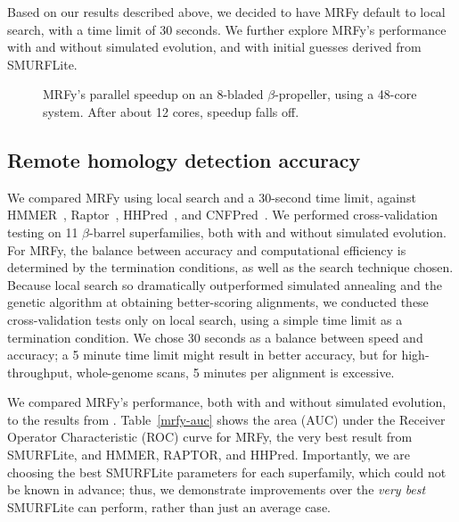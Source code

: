 \documentclass[blockstyle,times,preprint]{sigplanconf}
\begin{document}
Based on our results described above, we decided to have MRFy default to local 
search, with a time limit of 30 seconds.
We further explore MRFy's performance with and without simulated evolution,
and with initial guesses derived from SMURFLite.

\begin{figure}[htb!]
\begin{center}
   \caption{MRFy's parallel speedup on an 8-bladed $\beta$-propeller, using a
   48-core system.
   After about 12 cores, speedup falls off.}
   \label{speedup}
 \end{center}
\end{figure}

\subsection{Remote homology detection accuracy}

We compared MRFy using local search and a 30-second time limit, against 
HMMER~\cite{Eddy:1998ut},
Raptor~\cite{Xu:2003p3417}, HHPred~\cite{Soding:2005ff}, 
and CNFPred~\cite{JianzhuMa:2012cp}.
We performed cross-validation testing on 11 $\beta$-barrel superfamilies, both
with and without simulated evolution.
For MRFy, the balance between accuracy and computational efficiency is 
determined by the termination conditions, as well as the search technique 
chosen.
Because local search so dramatically outperformed simulated annealing and the
genetic algorithm at obtaining better-scoring alignments, we conducted these 
cross-validation tests only on local search, using a simple time limit as a
termination condition.
We chose 30 seconds as a balance between speed and accuracy; a 5 minute time
limit might result in better accuracy, but for high-throughput, whole-genome 
scans, 5 minutes per alignment is excessive.

We compared MRFy's performance, both with and without simulated evolution, to 
the results from \citet{Daniels:2012dg}.
Table~\ref{mrfy-auc} shows the area (AUC) under the Receiver Operator 
Characteristic (ROC) curve for MRFy, the very best result from SMURFLite, and
HMMER, RAPTOR, and HHPred.
Importantly, we are choosing the best SMURFLite parameters for each superfamily,
which could not be known in advance; thus, we demonstrate improvements over the
\emph{very best} SMURFLite can perform, rather than just an average case.
\end{document}
